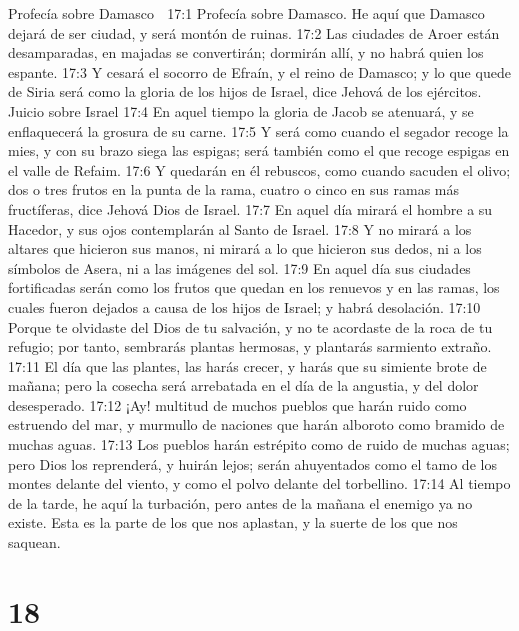Profecía sobre Damasco  

17:1 Profecía sobre Damasco. He aquí que Damasco dejará de ser ciudad, y será montón de ruinas.  
17:2 Las ciudades de Aroer están desamparadas, en majadas se convertirán; dormirán allí, y no habrá quien los espante.  
17:3 Y cesará el socorro de Efraín, y el reino de Damasco; y lo que quede de Siria será como la gloria de los hijos de Israel, dice Jehová de los ejércitos.  
Juicio sobre Israel  
17:4 En aquel tiempo la gloria de Jacob se atenuará, y se enflaquecerá la grosura de su carne.  
17:5 Y será como cuando el segador recoge la mies, y con su brazo siega las espigas; será también como el que recoge espigas en el valle de Refaim.  
17:6 Y quedarán en él rebuscos, como cuando sacuden el olivo; dos o tres frutos en la punta de la rama, cuatro o cinco en sus ramas más fructíferas, dice Jehová Dios de Israel.  
17:7 En aquel día mirará el hombre a su Hacedor, y sus ojos contemplarán al Santo de Israel.  
17:8 Y no mirará a los altares que hicieron sus manos, ni mirará a lo que hicieron sus dedos, ni a los símbolos de Asera, ni a las imágenes del sol.  
17:9 En aquel día sus ciudades fortificadas serán como los frutos que quedan en los renuevos y en las ramas, los cuales fueron dejados a causa de los hijos de Israel; y habrá desolación.  
17:10 Porque te olvidaste del Dios de tu salvación, y no te acordaste de la roca de tu refugio; por tanto, sembrarás plantas hermosas, y plantarás sarmiento extraño.  
17:11 El día que las plantes, las harás crecer, y harás que su simiente brote de mañana; pero la cosecha será arrebatada en el día de la angustia, y del dolor desesperado.  
17:12 ¡Ay! multitud de muchos pueblos que harán ruido como estruendo del mar, y murmullo de naciones que harán alboroto como bramido de muchas aguas.  
17:13 Los pueblos harán estrépito como de ruido de muchas aguas; pero Dios los reprenderá, y huirán lejos; serán ahuyentados como el tamo de los montes delante del viento, y como el polvo delante del torbellino.  
17:14 Al tiempo de la tarde, he aquí la turbación, pero antes de la mañana el enemigo ya no existe. Esta es la parte de los que nos aplastan, y la suerte de los que nos saquean.  

\chapter{18}

